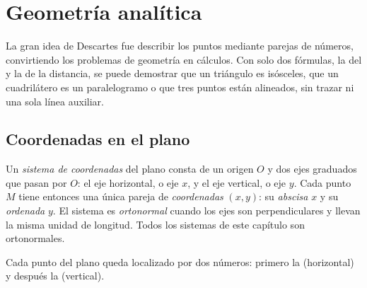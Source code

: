 \chapter{Geometría analítica}\label{ch:g10:coordgeom}

La gran idea de Descartes fue describir los puntos mediante parejas de
números, convirtiendo los problemas de geometría en cálculos. Con solo dos
fórmulas, la del  y la de la distancia, se puede demostrar que
un triángulo es isósceles, que un cuadrilátero es un paralelogramo o que
tres puntos están alineados, sin trazar ni una sola línea auxiliar.

\section{Coordenadas en el plano}

\begin{definition}\label{def:g10:coordgeom:system}
Un \emph{sistema de coordenadas} del plano
consta de un origen $O$ y dos ejes graduados que pasan por $O$: el eje
horizontal, o eje $x$, y el eje vertical, o eje $y$. Cada punto $M$ tiene
entonces una única pareja de \emph{coordenadas}
$(x, y)$: su \emph{abscisa} $x$ y su
\emph{ordenada} $y$. El sistema es
\emph{ortonormal} cuando los ejes son
perpendiculares y llevan la misma unidad de longitud. Todos los sistemas
de este capítulo son ortonormales.
\end{definition}

\begin{omfigure}

{\small Cada punto del plano queda localizado por dos números: primero la
 (horizontal) y después la  (vertical).}
\end{omfigure}

